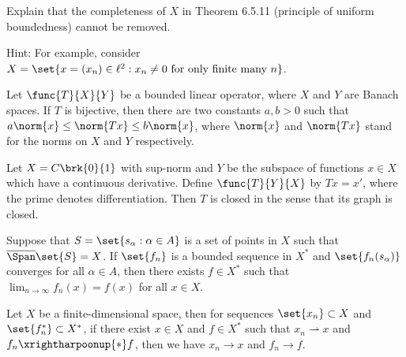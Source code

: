\documentclass[12pt,letterpaper,twoside]{hmcpset}
\begin{document}
\begin{solution}
  
\end{solution}

\begin{problem}[3]
  Explain that the completeness of $X$ in Theorem 6.5.11 (principle of uniform boundedness) cannot be removed.

  Hint: For example, consider $X = \set{x = (x_{n}) \in \ell^{2} : x_{n} \neq 0 \text{ for only finite many } n}$.
\end{problem}

\begin{problem}[4]
  Let $\func{T}{X}{Y}$ be a bounded linear operator, where $X$ and $Y$ are Banach spaces.  
  If $T$ is bijective, then there are two constants $a,b > 0$ such that $a\norm{x} \leq \norm{Tx} \leq b\norm{x}$, where $\norm{x}$ and $\norm{Tx}$ stand for the norms on $X$ and $Y$ respectively.
\end{problem}

\begin{problem}[5]
  Let $X = C\brk{0}{1}$ with sup-norm and $Y$ be the subspace of functions $x \in X$ which have a continuous derivative.
  Define $\func{T}{Y}{X}$ by $Tx = x'$, where the prime denotes differentiation.
  Then $T$ is closed in the sense that its graph is closed.
\end{problem}

\begin{problem}[6]
  Suppose that $S = \set{s_{\alpha} : \alpha \in A}$ is a set of points in $X$ such that $\overline{\Span}\set{S} = X$.
  If $\set{f_{n}}$ is a bounded sequence in $X^{*}$ and $\set{f_{n}(s_{\alpha})}$ converges for all $\alpha \in A$, then there exists $f \in X^{*}$ such that $\lim_{n\to\infty} f_{n}(x) = f(x)$ for all $x\in X$.
\end{problem}

\begin{problem}[7]
  Let $X$ be a finite-dimensional space, then for sequences $\set{x_{n}} \subset X$ and $\set{f_{n}^{*}} \subset X^{*}$, if there exist $x \in X$ and $f \in X^{*}$ such that $x_{n} \rightharpoonup x$ and $f_{n} \xrightharpoonup{*} f$, then we have $x_{n} \to x$ and $f_{n} \to f$.
\end{problem}
\end{document}
